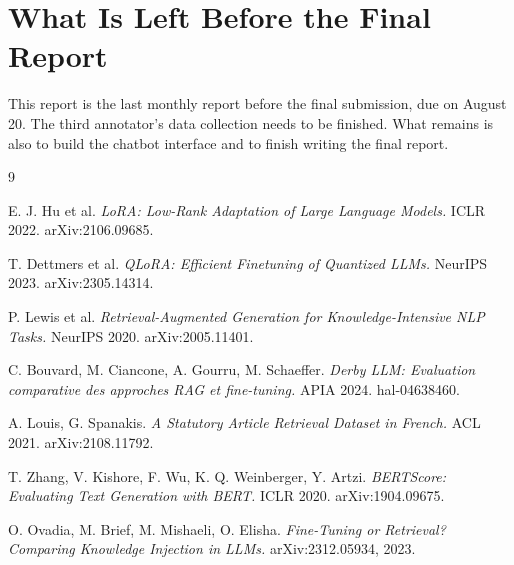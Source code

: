 \documentclass[11pt, a4paper]{article}
\begin{document}
\section{What Is Left Before the Final Report}

This report is the last monthly report before the final submission, due on August 20. The third annotator's data collection needs to be finished. What remains is also to build the chatbot interface and to finish writing the final report.

\begin{thebibliography}{9}

E. J. Hu et al.
\textit{LoRA: Low-Rank Adaptation of Large Language Models.}
ICLR 2022. arXiv:2106.09685.

T. Dettmers et al.
\textit{QLoRA: Efficient Finetuning of Quantized LLMs.}
NeurIPS 2023. arXiv:2305.14314.

P. Lewis et al.
\textit{Retrieval-Augmented Generation for Knowledge-Intensive NLP Tasks.}
NeurIPS 2020. arXiv:2005.11401.

C. Bouvard, M. Ciancone, A. Gourru, M. Schaeffer.
\textit{Derby LLM: Evaluation comparative des approches RAG et fine-tuning.}
APIA 2024. hal-04638460.

A. Louis, G. Spanakis.
\textit{A Statutory Article Retrieval Dataset in French.}
ACL 2021. arXiv:2108.11792.

T. Zhang, V. Kishore, F. Wu, K. Q. Weinberger, Y. Artzi.
\textit{BERTScore: Evaluating Text Generation with BERT.}
ICLR 2020. arXiv:1904.09675.

O. Ovadia, M. Brief, M. Mishaeli, O. Elisha.
\textit{Fine-Tuning or Retrieval? Comparing Knowledge Injection in LLMs.}
arXiv:2312.05934, 2023.

\end{thebibliography}
\end{document}
